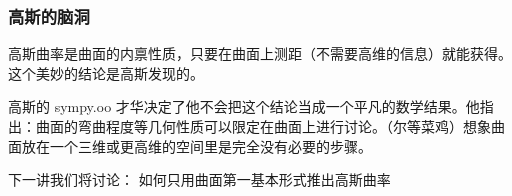 \documentclass[CJK,13pt]{beamer}
\begin{document}
\begin{frame}
  \frametitle{高斯的脑洞}
  {\blue 高斯曲率是曲面的内禀性质，只要在曲面上测距（不需要高维的信息）就能获得。}这个美妙的结论是高斯发现的。

  \skiplines
  
  高斯的 sympy.oo 才华决定了他不会把这个结论当成一个平凡的数学结果。他指出：曲面的弯曲程度等几何性质可以限定在曲面上进行讨论。{\blue（尔等菜鸡）想象曲面放在一个三维或更高维的空间里是完全没有必要的步骤。}


  
\end{frame}


\begin{frame}
  下一讲我们将讨论： 如何只用曲面第一基本形式推出高斯曲率
  
  

\end{frame}

\ech
\end{document}

